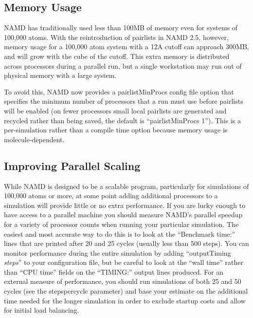 \subsection{Memory Usage}

NAMD has traditionally used less than 100MB of memory even for systems
of 100,000 atoms.  With the reintroduction of pairlists in NAMD 2.5,
however, memory usage for a 100,000 atom system with a 12A cutoff can
approach 300MB, and will grow with the cube of the cutoff.  This extra
memory is distributed across processors during a parallel run, but a
single workstation may run out of physical memory with a large system.

To avoid this, NAMD now provides a pairlistMinProcs config file option
that specifies the minimum number of processors that a run must use
before pairlists will be enabled (on fewer processors small local
pairlists are generated and recycled rather than being saved, the
default is ``pairlistMinProcs 1'').  This is a per-simulation rather than
a compile time option because memory usage is molecule-dependent.

\subsection{Improving Parallel Scaling}

While NAMD is designed to be a scalable program, particularly for
simulations of 100,000 atoms or more, at some point adding additional
processors to a simulation will provide little or no extra performance.
If you are lucky enough to have access to a parallel machine you should
measure NAMD's parallel speedup for a variety of processor counts when
running your particular simulation.  The easiest and most accurate way
to do this is to look at the ``Benchmark time:'' lines that are printed
after 20 and 25 cycles (usually less than 500 steps).  You can monitor
performance during the entire simulation by adding ``outputTiming {\em steps}''
to your configuration file, but be careful to look at the ``wall time''
rather than ``CPU time'' fields on the ``TIMING:'' output lines produced.
For an external measure of performance, you should run simulations of
both 25 and 50 cycles (see the stepspercycle parameter) and base your
estimate on the additional time needed for the longer simulation in
order to exclude startup costs and allow for initial load balancing.

